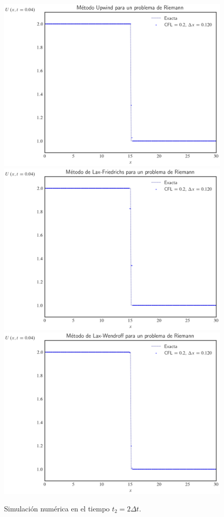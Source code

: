 \begin{figure}[ht!]
    \centering
    \includegraphics[width=.30\paperwidth]{../snapshots/upwindheaviside1d-2.png}
    \includegraphics[width=.30\paperwidth]{../snapshots/lax-friedrichsheaviside1d-2.png}
    \includegraphics[width=.30\paperwidth]{../snapshots/lax-wendroffheaviside1d-2.png}
    \caption{Simulación numérica en el tiempo $t_{2}=2\Delta t$.}
    \label{fig:example2t2}
\end{figure}

